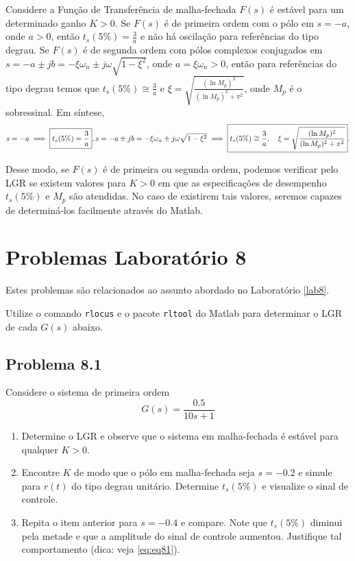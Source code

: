 \documentclass[
]{book}
\providecommand{\tightlist}{%
  \setlength{\itemsep}{0pt}\setlength{\parskip}{0pt}}
\theoremstyle{definition}
\theoremstyle{definition}
\theoremstyle{definition}
\theoremstyle{remark}
\begin{document}
Considere a Função de Transferência de malha-fechada \(F(s)\) é estável para um determinado ganho \(K>0\). Se \(F(s)\) é de primeira ordem com o pólo em \(s = -a\), onde \(a > 0\), então \(t_s(5\%) = \frac{3}{a}\) e não há oscilação para referências do tipo degrau. Se \(F(s)\) é de segunda ordem com pólos complexos conjugados em \(s=-a \pm jb = -\xi\omega_n \pm j\omega\sqrt{1-\xi^2}\), onde \(a = \xi\omega_n >0\), então para referências do tipo degrau temos que \(t_s(5\%) \cong \frac{3}{a}\) e \(\xi = \sqrt{\frac{(\ln{M_p})^2}{(\ln{M_p})^2 + \pi^2}}\), onde \(M_p\) é o sobressinal. Em síntese,
\[
s = -a \implies \boxed{t_s(5\%) = \frac{3}{a}}, \\
s=-a \pm jb = -\xi\omega_n \pm j\omega\sqrt{1-\xi^2} \\
\implies \boxed{t_s(5\%) \cong \frac{3}{a}, \quad \xi = \sqrt{\frac{(\ln{M_p})^2}{(\ln{M_p})^2 + \pi^2}}}. \label{eq:eq81}
\]

Desse modo, se \(F(s)\) é de primeira ou segunda ordem, podemos verificar pelo LGR se existem valores para \(K>0\) em que as especificações de desempenho \(t_s(5\%)\) e \(M_p\) são atendidas. No caso de existirem tais valores, seremos capazes de determiná-los facilmente através do Matlab.

\hypertarget{problemas-laboratuxf3rio-8}{%
\chapter*{Problemas Laboratório 8}\label{problemas-laboratuxf3rio-8}}

Estes problemas são relacionados ao assunto abordado no Laboratório \ref{lab8}.

Utilize o comando \texttt{rlocus} e o pacote \texttt{rltool} do Matlab para determinar o LGR de cada \(G(s)\) abaixo.

\hypertarget{problema-8.1}{%
\section*{Problema 8.1}\label{problema-8.1}}

Considere o sistema de primeira ordem
\[
G(s) = \frac{0.5}{10s + 1}
\]

\begin{enumerate}
\def\labelenumi{\alph{enumi}.}
\tightlist
\item
  Determine o LGR e observe que o sistema em malha-fechada é estável para qualquer \(K>0\).
\item
  Encontre \(K\) de modo que o pólo em malha-fechada seja \(s = -0.2\) e simule para \(r(t)\) do tipo degrau unitário. Determine \(t_s(5\%)\) e visualize o sinal de controle.
\item
  Repita o item anterior para \(s = -0.4\) e compare. Note que \(t_s(5\%)\) diminui pela metade e que a amplitude do sinal de controle aumentou. Justifique tal comportamento (dica: veja \eqref{eq:eq81}).
\end{enumerate}
\end{document}
